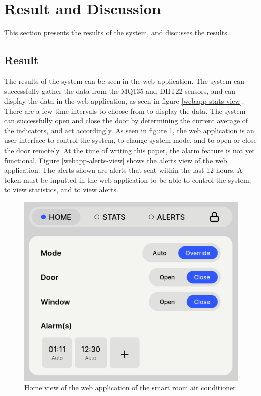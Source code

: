 \section{Result and Discussion}
This section presents the results of the system,
and discusses the results.

\subsection{Result}
The results of the system can be seen in the web
application. The system can successfully gather the data from the
MQ135 and DHT22 sensors, and can display the data in
the web application, as seen in figure \ref{webapp-stats-view}.
There are a few time intervals to choose from to display the data.
The system can successfully open and close the door by
determining the current average of the indicators,
and act accordingly. As seen in figure \ref{webapp-home-view},
the web application is an user interface to control the system,
to change system mode, and to open or close the door remotely.
At the time of writing this paper, the alarm feature is not yet functional.
Figure \ref{webapp-alerts-view} shows the alerts view of the web application.
The alerts shown are alerts that sent within the last 12 hours.
A token must be inputted in the web application to be able to control the system,
to view statistics, and to view alerts.

\begin{figure}
      \centerline{\includegraphics[scale=0.2]{resources/webapp-home-view.png}}
      \caption{Home view of the web application of the smart room air conditioner}
      \label{webapp-home-view}
\end{figure}

